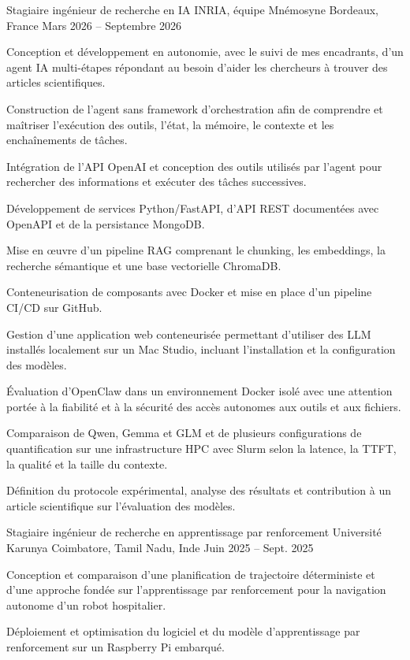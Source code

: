 
\begin{cventries}
  \cventry
    {Stagiaire ingénieur de recherche en IA}
    {INRIA, équipe Mnémosyne}
    {Bordeaux, France}
    {Mars 2026 -- Septembre 2026}
    {
      \begin{cvitems}
        \item {Conception et développement en autonomie, avec le suivi de mes encadrants, d’un agent IA multi-étapes répondant au besoin d’aider les chercheurs à trouver des articles scientifiques.}
        \item {Construction de l’agent sans framework d’orchestration afin de comprendre et maîtriser l’exécution des outils, l’état, la mémoire, le contexte et les enchaînements de tâches.}
        \item {Intégration de l’API OpenAI et conception des outils utilisés par l’agent pour rechercher des informations et exécuter des tâches successives.}
        \item {Développement de services Python/FastAPI, d’API REST documentées avec OpenAPI et de la persistance MongoDB.}
        \item {Mise en œuvre d’un pipeline RAG comprenant le chunking, les embeddings, la recherche sémantique et une base vectorielle ChromaDB.}
        \item {Conteneurisation de composants avec Docker et mise en place d’un pipeline CI/CD sur GitHub.}
        \item {Gestion d’une application web conteneurisée permettant d’utiliser des LLM installés localement sur un Mac Studio, incluant l’installation et la configuration des modèles.}
        \item {Évaluation d’OpenClaw dans un environnement Docker isolé avec une attention portée à la fiabilité et à la sécurité des accès autonomes aux outils et aux fichiers.}
        \item {Comparaison de Qwen, Gemma et GLM et de plusieurs configurations de quantification sur une infrastructure HPC avec Slurm selon la latence, la TTFT, la qualité et la taille du contexte.}
        \item {Définition du protocole expérimental, analyse des résultats et contribution à un article scientifique sur l’évaluation des modèles.}
      \end{cvitems}
    }

  \cventry
    {Stagiaire ingénieur de recherche en apprentissage par renforcement}
    {Université Karunya}
    {Coimbatore, Tamil Nadu, Inde}
    {Juin 2025 -- Sept. 2025}
    {
      \begin{cvitems}
        \item {Conception et comparaison d’une planification de trajectoire déterministe et d’une approche fondée sur l’apprentissage par renforcement pour la navigation autonome d’un robot hospitalier.}
        \item {Déploiement et optimisation du logiciel et du modèle d’apprentissage par renforcement sur un Raspberry Pi embarqué.}
      \end{cvitems}
    }
\end{cventries}
